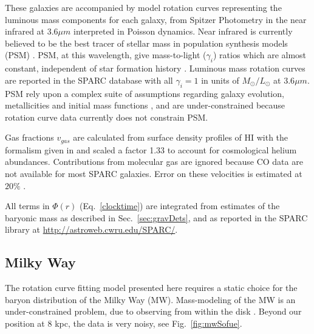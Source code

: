\documentclass[reprint,%
 amsmath,amssymb,
 aps,
]{revtex4-1}
\begin{document}
These galaxies are  accompanied by model rotation curves representing   the  luminous mass components for each galaxy,  from   Spitzer Photometry in the 
   near infrared  at 3.6$\mu m$ interpreted in Poisson dynamics. 
   Near infrared  is  currently believed to be the best tracer of stellar mass   in population synthesis models (PSM) \cite{10.1093/mnras/sty3223}.  PSM, at this wavelength,   give mass-to-light ($\gamma_i$) ratios which are almost constant, independent of star formation history \cite{BelldYong,10.1093/mnras/sty3223}. Luminous mass rotation curves are reported in the SPARC database with all $\gamma_i=1$ in units of $M_{\odot} / L_{\odot}$   at 3.6$\mu m$. 
   PSM rely upon a complex  suite of  assumptions regarding galaxy evolution, metallicities and initial mass functions  \cite{BelldYong,10.1093/mnras/sty3223}, and are under-constrained   because rotation curve data currently does not constrain PSM\cite{Conroy,Dutton_2005}.   
   
     Gas fractions $v_{gas}$ are calculated from surface density profiles of HI  with the formalism given in  \cite{1983MNRAS.203..735C} and scaled 
     a factor 1.33 to account for cosmological helium abundances.  Contributions from molecular gas are ignored   because CO data are not available for most SPARC galaxies. 
     Error on these velocities is estimated at $20\%$ \cite{2016Lelli}. 

   
   
     All terms in $\Phi(r)$ (Eq.~\ref{clocktime})  are    integrated from estimates of the baryonic mass as described in Sec.~\ref{sec:gravDets}, and as reported  in the      SPARC  library at \url{http://astroweb.cwru.edu/SPARC/}.    

 
   

  
 


\subsection{Milky Way}\label{MWselect}


The rotation curve fitting model presented here requires a static choice for the baryon distribution of the   Milky Way (MW). 
Mass-modeling of the MW is an under-constrained problem, due to     observing from       within  the disk  \cite{1991ARA&A..29..409F}.
 Beyond our position at 8 kpc, the data is very 
 noisy, see  Fig.~\ref{fig:mwSofue}.  
 
\end{document}

